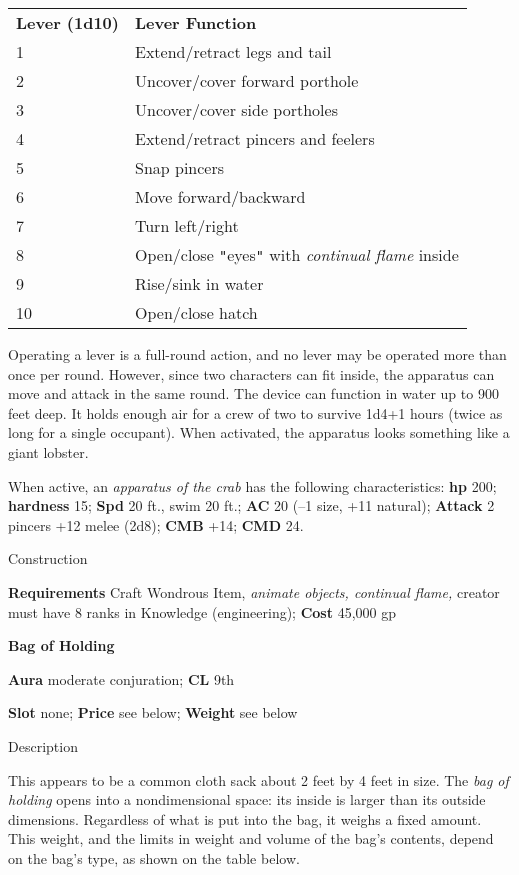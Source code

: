 \begin{tabular}{ll}
\textbf{Lever (1d10)} & \textbf{Lever Function}\\
1 & Extend/retract legs and tail\\
2 & Uncover/cover forward porthole\\
3 & Uncover/cover side portholes\\
4 & Extend/retract pincers and feelers\\
5 & Snap pincers\\
6 & Move forward/backward\\
7 & Turn left/right\\
8 & Open/close \texttt{{}"{}}eyes\texttt{{}"{}} with \textit{continual flame }inside\\
9 & Rise/sink in water\\
10 & Open/close hatch\\
\end{tabular}

				
Operating a lever is a full-round action, and no lever may be operated more than once per round. However, since two characters can fit inside, the apparatus can move and attack in the same round. The device can function in water up to 900 feet deep. It holds enough air for a crew of two to survive 1d4+1 hours (twice as long for a single occupant). When activated, the apparatus looks something like a giant lobster.
				
When active, an \textit{apparatus of the crab} has the following characteristics: \textbf{hp} 200; \textbf{hardness} 15; \textbf{Spd} 20 ft., swim 20 ft.; \textbf{AC} 20 (--1 size, +11 natural); \textbf{Attack} 2 pincers +12 melee (2d8); \textbf{CMB }+14; \textbf{CMD} 24.
				
Construction
				
\textbf{Requirements} Craft Wondrous Item, \textit{animate objects, continual flame, }creator must have 8 ranks in Knowledge (engineering); \textbf{Cost }45,000 gp
				
\textbf{Bag of Holding}
				
\textbf{Aura} moderate conjuration;\textbf{ CL }9th
				
\textbf{Slot} none; \textbf{Price} see below; \textbf{Weight }see below
				
Description
				
This appears to be a common cloth sack about 2 feet by 4 feet in size. The \textit{bag of holding }opens into a nondimensional space: its inside is larger than its outside dimensions. Regardless of what is put into the bag, it weighs a fixed amount. This weight, and the limits in weight and volume of the bag's contents, depend on the bag's type, as shown on the table below.
				
